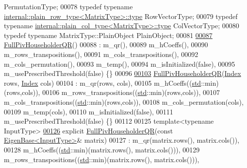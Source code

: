 \begin{DoxyCode}
       PermutationType;
00078     \textcolor{keyword}{typedef} \textcolor{keyword}{typename} \hyperlink{class_eigen_1_1internal_1_1_tensor_lazy_evaluator_writable}{internal::plain\_row\_type<MatrixType>::type} 
      RowVectorType;
00079     \textcolor{keyword}{typedef} \textcolor{keyword}{typename} \hyperlink{class_eigen_1_1internal_1_1_tensor_lazy_evaluator_writable}{internal::plain\_col\_type<MatrixType>::type} 
      ColVectorType;
00080     \textcolor{keyword}{typedef} \textcolor{keyword}{typename} MatrixType::PlainObject PlainObject;
00081 
\hyperlink{group___q_r___module_aeb14b4c1eef33128207b40a00bd0bd08}{00087}     \hyperlink{group___q_r___module_aeb14b4c1eef33128207b40a00bd0bd08}{FullPivHouseholderQR}()
00088       : m\_qr(),
00089         m\_hCoeffs(),
00090         m\_rows\_transpositions(),
00091         m\_cols\_transpositions(),
00092         m\_cols\_permutation(),
00093         m\_temp(),
00094         m\_isInitialized(false),
00095         m\_usePrescribedThreshold(false) \{\}
00096 
\hyperlink{group___q_r___module_abf722e1dc7241a5d6f76460ef0c87821}{00103}     \hyperlink{group___q_r___module_abf722e1dc7241a5d6f76460ef0c87821}{FullPivHouseholderQR}(\hyperlink{namespace_eigen_a62e77e0933482dafde8fe197d9a2cfde}{Index} rows, \hyperlink{namespace_eigen_a62e77e0933482dafde8fe197d9a2cfde}{Index} cols)
00104       : m\_qr(rows, cols),
00105         m\_hCoeffs((\hyperlink{namespacestd}{std}::min)(rows,cols)),
00106         m\_rows\_transpositions((\hyperlink{namespacestd}{std}::min)(rows,cols)),
00107         m\_cols\_transpositions((\hyperlink{namespacestd}{std}::min)(rows,cols)),
00108         m\_cols\_permutation(cols),
00109         m\_temp(cols),
00110         m\_isInitialized(false),
00111         m\_usePrescribedThreshold(false) \{\}
00112 
00125     \textcolor{keyword}{template}<\textcolor{keyword}{typename} InputType>
\hyperlink{group___q_r___module_aeeace3abca6b215025e94c3e098b0a97}{00126}     \textcolor{keyword}{explicit} \hyperlink{group___q_r___module_aeeace3abca6b215025e94c3e098b0a97}{FullPivHouseholderQR}(\textcolor{keyword}{const} \hyperlink{group___core___module_struct_eigen_1_1_eigen_base}{EigenBase<InputType>}& 
      matrix)
00127       : m\_qr(matrix.rows(), matrix.cols()),
00128         m\_hCoeffs((\hyperlink{namespacestd}{std}::min)(matrix.rows(), matrix.cols())),
00129         m\_rows\_transpositions((\hyperlink{namespacestd}{std}::min)(matrix.rows(), matrix.cols())),

\end{DoxyCode}
